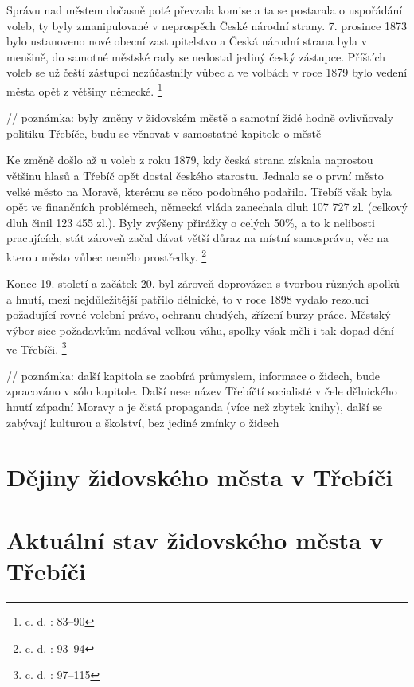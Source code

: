 \documentclass[a4paper,oneside,12p]{report}
\let\openright=\clearpage
\begin{document}
Správu nad městem dočasně poté převzala komise a ta se postarala o uspořádání voleb, ty byly zmanipulované v neprospěch České národní strany.
7. prosince 1873 bylo ustanoveno nové obecní zastupitelstvo a Česká národní strana byla v menšině, do samotné městské rady se nedostal jediný český zástupce.
Příštích voleb se už čeští zástupci nezúčastnily vůbec a ve volbách v roce 1879 bylo vedení města opět z většiny německé. \footnote{c. d. : 83--90}

// poznámka: byly změny v židovském městě a samotní židé hodně ovlivňovaly politiku Třebíče, budu se věnovat v samostatné kapitole o městě

Ke změně došlo až u voleb z roku 1879, kdy česká strana získala naprostou většinu hlasů a Třebíč opět dostal českého starostu.
Jednalo se o první město velké město na Moravě, kterému se něco podobného podařilo.
Třebíč však byla opět ve finančních problémech, německá vláda zanechala dluh 107 727 zl. (celkový dluh činil 123 455 zl.).
Byly zvýšeny přirážky o celých 50\%, a to k nelibosti pracujících, stát zároveň začal dávat větší důraz na místní samosprávu, věc na kterou město vůbec nemělo prostředky. \footnote{c. d. : 93--94}

Konec 19. století a začátek 20. byl zároveň doprovázen s tvorbou různých spolků a hnutí, mezi nejdůležitější patřilo dělnické, to v roce 1898 vydalo rezoluci požadující rovné volební právo, ochranu chudých, zřízení burzy práce.
Městský výbor sice požadavkům nedával velkou váhu, spolky však měli i tak dopad dění ve Třebíči. \footnote{c. d. : 97--115}

// poznámka: další kapitola se zaobírá průmyslem, informace o židech, bude zpracováno v sólo kapitole. Další nese název Třebíčtí socialisté v čele dělnického hnutí západní Moravy a je čistá propaganda (více než zbytek knihy), další se zabývají kulturou a školství, bez jediné zmínky o židech

\chapter{Dějiny židovského města v Třebíči}

\chapter{Aktuální stav židovského města v Třebíči}





\listoffigures
\openright
\end{document}
